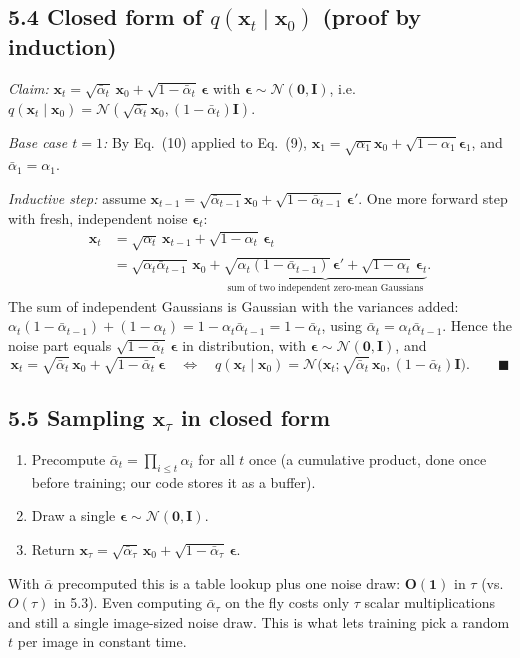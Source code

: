 \documentclass[11pt,a4paper]{article}
\newcommand{\N}{\mathcal{N}}
\newcommand{\x}{\mathbf{x}}
\newcommand{\abar}{\bar{\alpha}}
\begin{document}
\subsection*{5.4 Closed form of $q(\x_t\mid\x_0)$ (proof by induction)}

\emph{Claim:} $\x_t = \sqrt{\abar_t}\,\x_0 + \sqrt{1-\abar_t}\,\bm{\epsilon}$ with $\bm{\epsilon}\sim\N(\mathbf{0},\mathbf{I})$, i.e.\ $q(\x_t\mid\x_0)=\N(\sqrt{\abar_t}\x_0,(1-\abar_t)\mathbf{I})$.

\emph{Base case $t=1$:} By Eq.~(10) applied to Eq.~(9), $\x_1=\sqrt{\alpha_1}\x_0+\sqrt{1-\alpha_1}\bm{\epsilon}_1$, and $\abar_1=\alpha_1$. \checkmark

\emph{Inductive step:} assume $\x_{t-1}=\sqrt{\abar_{t-1}}\x_0+\sqrt{1-\abar_{t-1}}\,\bm{\epsilon}'$. One more forward step with fresh, independent noise $\bm{\epsilon}_t$:
\begin{align*}
\x_t &= \sqrt{\alpha_t}\,\x_{t-1}+\sqrt{1-\alpha_t}\,\bm{\epsilon}_t\\
&= \sqrt{\alpha_t\abar_{t-1}}\,\x_0 + \underbrace{\sqrt{\alpha_t(1-\abar_{t-1})}\,\bm{\epsilon}' + \sqrt{1-\alpha_t}\,\bm{\epsilon}_t}_{\text{sum of two independent zero-mean Gaussians}}.
\end{align*}
The sum of independent Gaussians is Gaussian with the variances added:
$\alpha_t(1-\abar_{t-1})+(1-\alpha_t)=1-\alpha_t\abar_{t-1}=1-\abar_t$, using $\abar_t=\alpha_t\abar_{t-1}$. Hence the noise part equals $\sqrt{1-\abar_t}\,\bm{\epsilon}$ in distribution, with $\bm{\epsilon}\sim\N(\mathbf{0},\mathbf{I})$, and
\[
\x_t=\sqrt{\abar_t}\,\x_0+\sqrt{1-\abar_t}\,\bm{\epsilon}
\quad\Longleftrightarrow\quad
q(\x_t\mid\x_0)=\N\big(\x_t;\sqrt{\abar_t}\,\x_0,(1-\abar_t)\mathbf{I}\big). \qquad\blacksquare
\]

\subsection*{5.5 Sampling $\x_\tau$ in closed form}

\begin{enumerate}[nosep]
\item Precompute $\abar_t=\prod_{i\le t}\alpha_i$ for all $t$ once (a cumulative product, done once before training; our code stores it as a buffer).
\item Draw a single $\bm{\epsilon}\sim\N(\mathbf{0},\mathbf{I})$.
\item Return $\x_\tau=\sqrt{\abar_\tau}\,\x_0+\sqrt{1-\abar_\tau}\,\bm{\epsilon}$.
\end{enumerate}
With $\abar$ precomputed this is a table lookup plus one noise draw: $\bm{O(1)}$ in $\tau$ (vs.\ $O(\tau)$ in 5.3). Even computing $\abar_\tau$ on the fly costs only $\tau$ scalar multiplications and still a single image-sized noise draw. This is what lets training pick a random $t$ per image in constant time.
\end{document}
